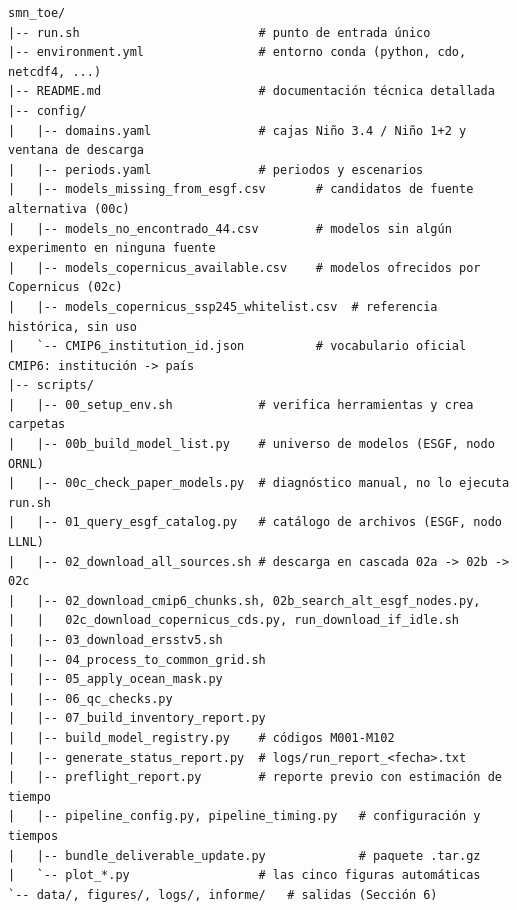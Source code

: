 \documentclass[11pt,a4paper]{article}
\begin{document}
\begin{lstlisting}[basicstyle=\ttfamily\scriptsize]
smn_toe/
|-- run.sh                         # punto de entrada único
|-- environment.yml                # entorno conda (python, cdo, netcdf4, ...)
|-- README.md                      # documentación técnica detallada
|-- config/
|   |-- domains.yaml               # cajas Niño 3.4 / Niño 1+2 y ventana de descarga
|   |-- periods.yaml               # periodos y escenarios
|   |-- models_missing_from_esgf.csv       # candidatos de fuente alternativa (00c)
|   |-- models_no_encontrado_44.csv        # modelos sin algún experimento en ninguna fuente
|   |-- models_copernicus_available.csv    # modelos ofrecidos por Copernicus (02c)
|   |-- models_copernicus_ssp245_whitelist.csv  # referencia histórica, sin uso
|   `-- CMIP6_institution_id.json          # vocabulario oficial CMIP6: institución -> país
|-- scripts/
|   |-- 00_setup_env.sh            # verifica herramientas y crea carpetas
|   |-- 00b_build_model_list.py    # universo de modelos (ESGF, nodo ORNL)
|   |-- 00c_check_paper_models.py  # diagnóstico manual, no lo ejecuta run.sh
|   |-- 01_query_esgf_catalog.py   # catálogo de archivos (ESGF, nodo LLNL)
|   |-- 02_download_all_sources.sh # descarga en cascada 02a -> 02b -> 02c
|   |-- 02_download_cmip6_chunks.sh, 02b_search_alt_esgf_nodes.py,
|   |   02c_download_copernicus_cds.py, run_download_if_idle.sh
|   |-- 03_download_ersstv5.sh
|   |-- 04_process_to_common_grid.sh
|   |-- 05_apply_ocean_mask.py
|   |-- 06_qc_checks.py
|   |-- 07_build_inventory_report.py
|   |-- build_model_registry.py    # códigos M001-M102
|   |-- generate_status_report.py  # logs/run_report_<fecha>.txt
|   |-- preflight_report.py        # reporte previo con estimación de tiempo
|   |-- pipeline_config.py, pipeline_timing.py   # configuración y tiempos
|   |-- bundle_deliverable_update.py             # paquete .tar.gz
|   `-- plot_*.py                  # las cinco figuras automáticas
`-- data/, figures/, logs/, informe/   # salidas (Sección 6)
\end{lstlisting}
\end{document}
